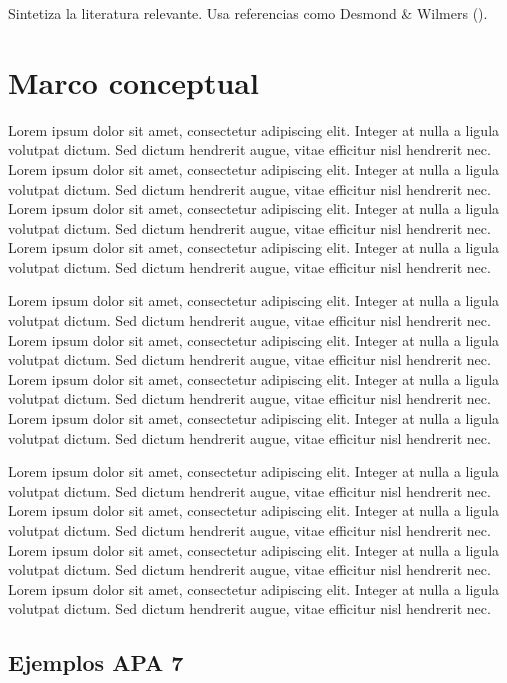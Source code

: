 \documentclass[
  a4paper,
  oneside]{scrbook}
\begin{document}
Sintetiza la literatura relevante. Usa referencias como Desmond \&
Wilmers ().

\section{Marco conceptual}\label{marco-conceptual}

Lorem ipsum dolor sit amet, consectetur adipiscing elit. Integer at
nulla a ligula volutpat dictum. Sed dictum hendrerit augue, vitae
efficitur nisl hendrerit nec. Lorem ipsum dolor sit amet, consectetur
adipiscing elit. Integer at nulla a ligula volutpat dictum. Sed dictum
hendrerit augue, vitae efficitur nisl hendrerit nec. Lorem ipsum dolor
sit amet, consectetur adipiscing elit. Integer at nulla a ligula
volutpat dictum. Sed dictum hendrerit augue, vitae efficitur nisl
hendrerit nec. Lorem ipsum dolor sit amet, consectetur adipiscing elit.
Integer at nulla a ligula volutpat dictum. Sed dictum hendrerit augue,
vitae efficitur nisl hendrerit nec.

Lorem ipsum dolor sit amet, consectetur adipiscing elit. Integer at
nulla a ligula volutpat dictum. Sed dictum hendrerit augue, vitae
efficitur nisl hendrerit nec. Lorem ipsum dolor sit amet, consectetur
adipiscing elit. Integer at nulla a ligula volutpat dictum. Sed dictum
hendrerit augue, vitae efficitur nisl hendrerit nec. Lorem ipsum dolor
sit amet, consectetur adipiscing elit. Integer at nulla a ligula
volutpat dictum. Sed dictum hendrerit augue, vitae efficitur nisl
hendrerit nec. Lorem ipsum dolor sit amet, consectetur adipiscing elit.
Integer at nulla a ligula volutpat dictum. Sed dictum hendrerit augue,
vitae efficitur nisl hendrerit nec.

Lorem ipsum dolor sit amet, consectetur adipiscing elit. Integer at
nulla a ligula volutpat dictum. Sed dictum hendrerit augue, vitae
efficitur nisl hendrerit nec. Lorem ipsum dolor sit amet, consectetur
adipiscing elit. Integer at nulla a ligula volutpat dictum. Sed dictum
hendrerit augue, vitae efficitur nisl hendrerit nec. Lorem ipsum dolor
sit amet, consectetur adipiscing elit. Integer at nulla a ligula
volutpat dictum. Sed dictum hendrerit augue, vitae efficitur nisl
hendrerit nec. Lorem ipsum dolor sit amet, consectetur adipiscing elit.
Integer at nulla a ligula volutpat dictum. Sed dictum hendrerit augue,
vitae efficitur nisl hendrerit nec.

\subsection{Ejemplos APA 7}\label{ejemplos-apa-7}
\end{document}
